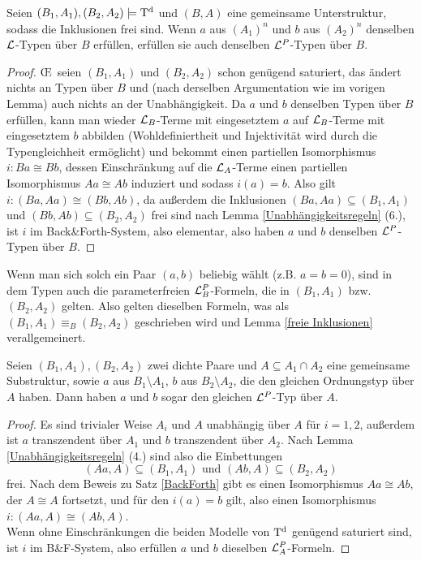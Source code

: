 \begin{lemma}\label{Gemeinsame Unterstruktur}
	Seien $(B_1,A_1),(B_2,A_2)\models\operatorname{T^d}$ und $(B,A)$ eine gemeinsame Unterstruktur, sodass die Inklusionen frei sind. Wenn $a$ aus $(A_1)^n$ und $b$ aus $(A_2)^n$ denselben $\mathcal{L}$-Typen über $B$ erfüllen, erfüllen sie auch denselben $\mathcal{L}^P$-Typen über $B$.
\end{lemma}
\begin{proof}
	\OE\ seien $(B_1,A_1)$ und $(B_2,A_2)$ schon genügend saturiert, das ändert nichts an Typen über $B$ und (nach derselben Argumentation wie im vorigen Lemma) auch nichts an der Unabhängigkeit. Da $a$ und $b$ denselben Typen über $B$ erfüllen, kann man wieder $\mathcal{L}_B$-Terme mit eingesetztem $a$ auf $\mathcal{L}_B$-Terme mit eingesetztem $b$ abbilden (Wohldefiniertheit und Injektivität wird durch die Typengleichheit ermöglicht) und bekommt einen partiellen Isomorphismus $i:Ba\cong Bb$, dessen Einschränkung auf die $\mathcal{L}_A$-Terme einen partiellen Isomorphismus $Aa\cong Ab$ induziert und sodass $i(a)=b$. Also gilt $i:(Ba,Aa)\cong(Bb,Ab)$, da außerdem die Inklusionen $(Ba,Aa)\subseteq(B_1,A_1)$ und $(Bb,Ab)\subseteq(B_2,A_2)$ frei sind nach Lemma \ref{Unabhängigkeitsregeln} (6.), ist $i$ im Back\&Forth-System, also elementar, also haben $a$ und $b$ denselben $\mathcal{L}^P$-Typen über $B$.
\end{proof}

\begin{corollary}
	Wenn man sich solch ein Paar $(a,b)$ beliebig wählt (z.B. $a=b=0$), sind in dem Typen auch die parameterfreien $\mathcal{L}^P_B$-Formeln, die in $(B_1,A_1)$ bzw. $(B_2,A_2)$ gelten. Also gelten dieselben Formeln, was als $(B_1,A_1)\equiv_B(B_2,A_2)$ geschrieben wird und Lemma \ref{freie Inklusionen} verallgemeinert.
\end{corollary}

\begin{lemma}\label{selber Schnitt}
	Seien $(B_1,A_1),(B_2,A_2)$ zwei dichte Paare und $A\subseteq A_1\cap A_2$ eine gemeinsame Substruktur, sowie $a$ aus $B_1\setminus A_1$, $b$ aus $B_2\setminus A_2$, die den gleichen Ordnungstyp über $A$ haben. Dann haben $a$ und $b$ sogar den gleichen $\mathcal{L}^P$-Typ über $A$.
\end{lemma}
\begin{proof}
	Es sind trivialer Weise $A_i$ und $A$ unabhängig über $A$ für $i=1,2$, außerdem ist $a$ transzendent über $A_1$ und $b$ transzendent über $A_2$. Nach Lemma \ref{Unabhängigkeitsregeln} (4.) sind also die Einbettungen $$(Aa,A)\subseteq(B_1,A_1)\text{ und }(Ab,A)\subseteq(B_2,A_2)$$ frei. Nach dem Beweis zu Satz \ref{BackForth} gibt es einen Isomorphismus $Aa\cong Ab$, der $A\cong A$ fortsetzt, und für den $i(a)=b$ gilt, also einen Isomorphismus $i:(Aa,A)\cong(Ab,A)$.\\ Wenn ohne Einschränkungen die beiden Modelle von $\operatorname{T^d}$ genügend saturiert sind, ist $i$ im B\&F-System, also erfüllen $a$ und $b$ dieselben $\mathcal{L}^P_A$-Formeln.
\end{proof}

